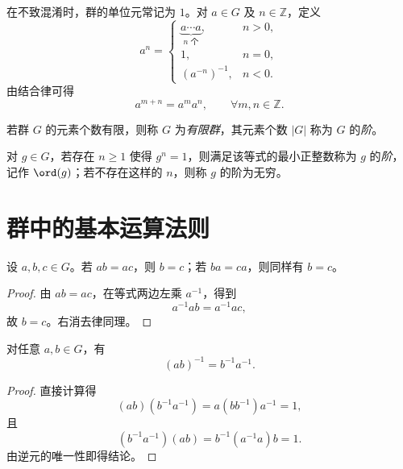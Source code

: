在不致混淆时，群的单位元常记为 $1$。对 $a\in G$ 及 $n\in\mathbb Z$，定义
\[
  a^n=
  \begin{cases}
    \underbrace{a\cdots a}_{n\text{ 个}}, & n>0,\\
    1, & n=0,\\
    (a^{-n})^{-1}, & n<0.
  \end{cases}
\]
由结合律可得
\[
  a^{m+n}=a^m a^n,\qquad \forall m,n\in\mathbb Z.
\]

\begin{definition}[群与元素的阶]
若群 $G$ 的元素个数有限，则称 $G$ 为\emph{有限群}，其元素个数 $|G|$ 称为 $G$ 的\emph{阶}。

对 $g\in G$，若存在 $n\geq 1$ 使得 $g^n=1$，则满足该等式的最小正整数称为 $g$ 的\emph{阶}，记作 $\ord(g)$；若不存在这样的 $n$，则称 $g$ 的阶为无穷。
\end{definition}

\section{群中的基本运算法则}

\begin{theorem}[消去律]
设 $a,b,c\in G$。若 $ab=ac$，则 $b=c$；若 $ba=ca$，则同样有 $b=c$。
\end{theorem}

\begin{proof}
由 $ab=ac$，在等式两边左乘 $a^{-1}$，得到
\[
  a^{-1}ab=a^{-1}ac,
\]
故 $b=c$。右消去律同理。
\end{proof}

\begin{theorem}[乘积的逆]
对任意 $a,b\in G$，有
\[
  (ab)^{-1}=b^{-1}a^{-1}.
\]
\end{theorem}

\begin{proof}
直接计算得
\[
  (ab)(b^{-1}a^{-1})=a(bb^{-1})a^{-1}=1,
\]
且
\[
  (b^{-1}a^{-1})(ab)=b^{-1}(a^{-1}a)b=1.
\]
由逆元的唯一性即得结论。
\end{proof}
